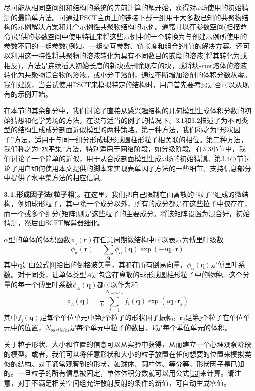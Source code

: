 \documentclass[12pt，a4paper]{article}
\numberwithin{equation}{section}
\begin{document}
尽可能从相同空间组和结构的系统的先前计算的解开始，获得对$\omega$场使用的初始猜测的最简单方法。可通过PSCF主页上的链接下载一组用于大多数已知的共聚物结构的示例解决方案和几个示例性共聚物结构的示例。通常可以在参数空间(扫描命令)提供的参数空间中使用特征来将这些示例中的一个转换为与创建示例所使用的参数不同的一组参数(例如，一组交互参数、链长度和组合的值)的解决方案。还可以利用这一特性将共聚物的溶液转化为具有不同数目的嵌段的溶液(将其转化为或相反)，方法是连续插入初始长度的新块或删除现有的块，或将块-mer熔体的溶液转化为共聚物混合物的溶液。或小分子溶剂，通过不断增加溶剂的体积分数从零。我们建议，当尝试使用PSCT来模拟特定的结构时，用户首先要考虑是否可以从现有的示例开始。

在本节的其余部分中，我们讨论了直接从感兴趣结构的几何模型生成体积分数的初始猜想和化学势场的方法，在没有适当的例子的情况下。3.1和3.2描述了为不同类型的结构生成成分剖面近似模型的两种策略。第一种方法，我们称之为“形状因子”方法，适用于与同一组分形成球形或圆柱形粒子相关联的相位。第二种方法，我们称之为“水平集”方法，特别适用于网络阶段，如分级阶段。在3.3小节中，我们讨论了一个简单的近似，用于从合成剖面模型生成$\omega$场的初始猜测。第3.4小节讨论了用户如何使用本文提供的脚本来实现表单因子方法的一些细节。支持信息部分中提供了水平集方法的相应信息。

\textbf{3.1.形成因子法(粒子相)。}在这里，我们把自己限制在由离散的“粒子”组成的微结构，例如球形粒子，其中除一个成分以外，所有的成分都是在这些粒子中仅存在，而一个或多个组分(矩阵)则是这些粒子的主要成分。将该矩阵设置为混合好，初始猜测，然后由SCFT解算器细化。

$\alpha$型的单体的体积函数$\phi _{\alpha}(\mathbf{r})$在任意周期微结构中可以表示为傅里叶级数
\begin{equation}\label{12}
\phi _{\alpha}(\mathbf{r})=\sum _{\mathbf{q}}\phi _{\alpha}(\mathbf{q})\exp (-i \mathbf{q} \cdot \mathbf{r})
\end{equation}
其中$\mathbf{q}$是由公式\ref{9}给出的倒格波矢量，其和在所有倒易向量，$\phi _{\alpha}(\mathbf{q})$是傅里叶系数。对于同类，让单体类型$A$是包含在离散的球形或圆柱形粒子中的物种。这个分量的每一个傅里叶系数$\phi _{A}(\mathbf{q})$都可以作为和
\begin{equation}\label{13}
\phi _{A}(\mathbf{q})=\frac{1}{V}\sum _{j=1}^{N_{particles}} f_{j}(\mathbf{q})\exp (i \mathbf{q} \cdot \mathbf{r}_j)
\end{equation}
其中$f_{j}(\mathbf{q})$是每个单位单元中第$j$个粒子的形状因子振幅，$\mathbf{r}_j$是第$j$个粒子在单位单元中的位置，$N_{particles}$是每个单元中粒子的数目，$V$是每个单位单元的体积。

关于粒子形状、大小和位置的信息可以从实验中获得，从而建立一个心理观察阶段的模型。或者，我们可以将任意形状和大小的粒子放置在任何想要的位置来模拟类似的结构。对于通常观察到的形状，如球体、圆柱体、等分等，形状因子是已知的。一旦粒子的所有信息被固定，单体体积分数就可以用公式\ref{13}来计算。请注意，对于不满足相关空间组允许散射反射的条件的新值，可自动生成零值。
\end{document}
